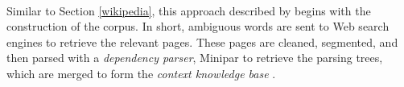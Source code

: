\documentclass[12 pt]{article}
\begin{document}
\paragraph{}
Similar to Section \ref{wikipedia}, this approach described by \cite{unsupervised} begins with the construction of the corpus. In short, ambiguous words are sent to Web search engines to retrieve the relevant pages. These pages are cleaned, segmented, and then parsed with a \textit{dependency parser}, Minipar \cite{minipar} to retrieve the parsing trees, which are merged to form the \textit{context knowledge base} \cite{unsupervised}.
\end{document}
